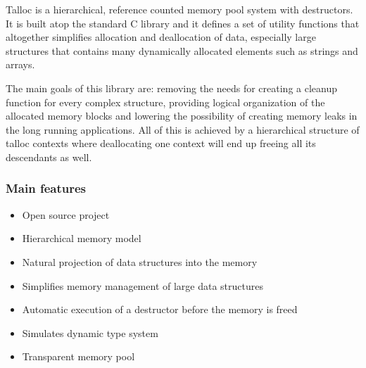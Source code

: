 Talloc is a hierarchical, reference counted memory pool system with destructors.
It is built atop the standard C library and it defines a set of utility
functions that altogether simplifies allocation and deallocation of data,
especially large structures that contains many dynamically allocated elements
such as strings and arrays.

The main goals of this library are: removing the needs for creating a cleanup
function for every complex structure, providing logical organization of
the allocated memory blocks and lowering the possibility of creating memory
leaks in the long running applications. All of this is achieved by a
hierarchical structure of talloc contexts where deallocating one context will
end up freeing all its descendants as well.

\subsubsection{Main features}
\begin{itemize}
  \item Open source project
  \item Hierarchical memory model
  \item Natural projection of data structures into the memory
  \item Simplifies memory management of large data structures
  \item Automatic execution of a destructor before the memory is freed
  \item Simulates dynamic type system
  \item Transparent memory pool
\end{itemize}